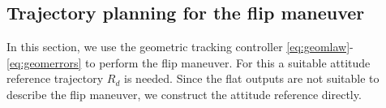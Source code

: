 \subsection{Trajectory planning for the flip maneuver}
In this section, we use the geometric tracking controller \eqref{eq:geomlaw}-\eqref{eq:geomerrors} to perform the flip maneuver. For this a suitable attitude reference trajectory $R_d$ is needed. Since the flat outputs are not suitable to describe the flip maneuver, we construct the attitude reference directly.

